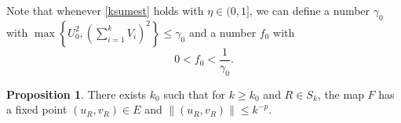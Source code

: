 \documentclass{amsart}
\theoremstyle{definition}
\newtheorem{proposition}[theorem]{Proposition}
\theoremstyle{remark}
\numberwithin{equation}{section}
\begin{document}
Note that whenever \eqref{ksumest} holds with $\eta \in (0,1]$, we can define a number $\gamma_0$ with $\displaystyle \max\left\{U_0^2 , \left(\sum_{i=1}^k V_{i}\right)^2\right\} \le \gamma_0$ and a number $f_0$ with \begin{equation}\label{f0}0< f_0 < \frac{1}{\gamma_0}.\end{equation}
\begin{proposition} \label{Fixed} There exists $k_0$ such that for $k\ge k_0$ and $R \in S_k$, the map $F$ has a fixed point $(u_R,v_R) \in E$ and $\|(u_R,v_R)\| \le k^{-p}$.
 \end{proposition}
\end{document}
